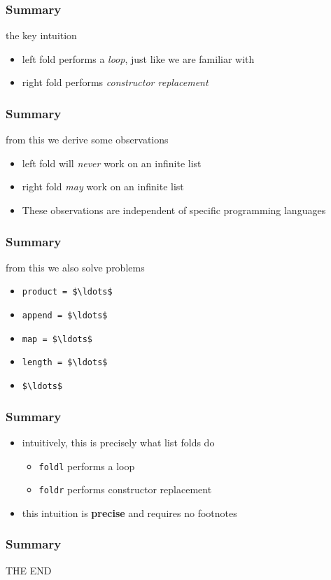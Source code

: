\begin{frame}
\frametitle{Summary}
\begin{block}{the key intuition}
\begin{itemize}
\item left fold performs a \emph{loop}, just like we are familiar with
\item right fold performs \emph{constructor replacement}
\end{itemize}
\end{block}
\end{frame}

\begin{frame}
\frametitle{Summary}
\begin{block}{from this we derive some observations}
\begin{itemize}
\item left fold will \emph{never} work on an infinite list
\item right fold \emph{may} work on an infinite list
\item These observations are independent of specific programming languages
\end{itemize}
\end{block}
\end{frame}

\begin{frame}[fragile]
\frametitle{Summary}
\begin{block}{from this we also solve problems}
\begin{itemize}
\item \lstinline[mathescape]{product = $\ldots$}
\item \lstinline[mathescape]{append = $\ldots$}
\item \lstinline[mathescape]{map = $\ldots$}
\item \lstinline[mathescape]{length = $\ldots$}
\item \lstinline[mathescape]{$\ldots$}
\end{itemize}
\end{block}
\end{frame}

\begin{frame}
\frametitle{Summary}
\begin{block}{}
\begin{itemize}
\item intuitively, this is precisely what list folds do
  \begin{itemize}
  \item \lstinline[basicstyle=\ttfamily]$foldl$ performs a loop
  \item \lstinline[basicstyle=\ttfamily]$foldr$ performs constructor replacement
  \end{itemize}
\item this intuition is \textbf{precise} and requires no footnotes
\end{itemize}
\end{block}
\end{frame}

\begin{frame}
\frametitle{Summary}
\begin{center}
THE END
\end{center}
\end{frame}
